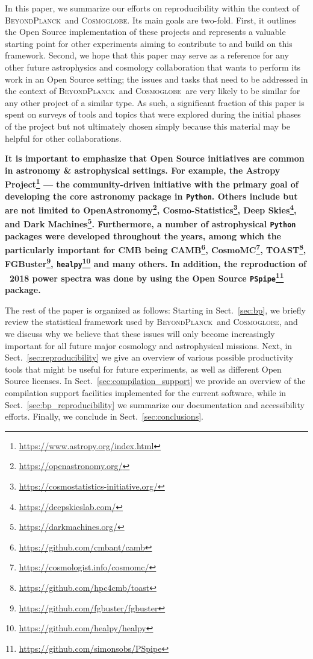 \documentclass[twocolumn]{openjournal}
\newcommand{\BP}{\textsc{BeyondPlanck}}
\newcommand{\cosmoglobe}{\textsc{Cosmoglobe}}
\begin{document}
In this paper, we summarize our efforts on reproducibility within the context
of \BP\ and \cosmoglobe. Its main goals are two-fold. First, it outlines the
Open Source implementation of these projects and represents a valuable starting
point for other experiments aiming to contribute to and build on this
framework. Second, we hope that this paper may serve as a reference for any
other future astrophysics and cosmology collaboration that wants to perform its
work in an Open Source setting; the issues and tasks that need to be addressed
in the context of \BP\ and \cosmoglobe\ are very likely to be similar for any
other project of a similar type. As such, a significant fraction of this paper
is spent on surveys of tools and topics that were explored during the initial
phases of the project but not ultimately chosen simply because this material
may be helpful for other collaborations.


\textbf{It is important to emphasize that Open Source initiatives are common in astronomy \& astrophysical settings. For example, the Astropy Project\footnote{\url{https://www.astropy.org/index.html}} --- the community-driven initiative with the primary goal of developing the core astronomy package in \texttt{Python}. Others include but are not limited to OpenAstronomy\footnote{\url{https://openastronomy.org/}}, Cosmo-Statistics\footnote{\url{https://cosmostatistics-initiative.org/}}, Deep Skies\footnote{\url{https://deepskieslab.com/}}, and Dark Machines\footnote{\url{https://darkmachines.org/}}. Furthermore, a number of astrophysical \texttt{Python} packages were developed throughout the years, among which the particularly important for CMB being CAMB\footnote{\url{https://github.com/cmbant/camb}}, CosmoMC\footnote{\url{https://cosmologist.info/cosmomc/}}, TOAST\footnote{\url{https://github.com/hpc4cmb/toast}},  FGBuster\footnote{\url{https://github.com/fgbuster/fgbuster}}, \texttt{healpy}\footnote{\url{https://github.com/healpy/healpy}} and many others. In addition, the reproduction of \Planck\ 2018 power spectra was done by \cite{zack2021_a} using the Open Source \texttt{PSpipe}\footnote{\url{https://github.com/simonsobs/PSpipe}} package.}


The rest of the paper is organized as follows: Starting in Sect.~\ref{sec:bp},
we briefly review the statistical framework used by \BP\ and \cosmoglobe, and
we discuss why we believe that these issues will only become increasingly
important for all future major cosmology and astrophysical missions. Next, in
Sect.~\ref{sec:reproducibility} we give an overview of various possible
productivity tools that might be useful for future experiments, as well as
different Open Source licenses. In Sect.~\ref{sec:compilation_support} we
provide an overview of the compilation support facilities implemented for the
current software, while in Sect.~\ref{sec:bp_reproducibility} we summarize our
documentation and accessibility efforts. Finally, we conclude in
Sect.~\ref{sec:conclusions}.
\end{document}
